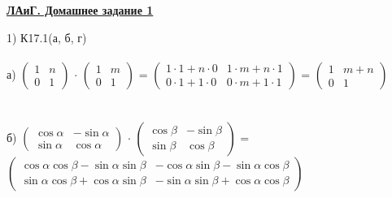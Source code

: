 \documentclass[12pt, a4paper]{article}
\newcommand{\B}[1]{\textbf{#1}}
\begin{document}
	\begin{center}
		\B{\underline{ЛАиГ. Домашнее задание 1}}
	\end{center}
	1) К17.1(а, б, г) \\
	\\
	а) 
	\begin{math}
		\left (
		\begin{array}{rr}
			1 & n\\
			0 & 1
		\end{array}
		\right )
	\end{math}
	$\cdot$ 
	\begin{math}
		\left (
		\begin{array}{rr}
			1 & m\\
			0 & 1
		\end{array}
		\right )
	\end{math}
	=
	\begin{math}
		\left (
		\begin{array}{rr}
			1 \cdot 1 + n \cdot 0 & 1 \cdot m + n \cdot 1\\
			0 \cdot 1 + 1 \cdot 0 & 0 \cdot m + 1 \cdot 1
		\end{array}
		\right )
	\end{math}
	=
	\begin{math}
		\left (
		\begin{array}{rr}
			1& m + n\\
			0 & 1
		\end{array}
		\right )
	\end{math}
	\\
	\\
	\\
	б)
	\begin{math}
		\left (
		\begin{array}{rr}
			\cos\alpha & -\sin\alpha\\
			\sin\alpha & \cos\alpha
		\end{array}
		\right )
	\end{math}
	$\cdot$
	\begin{math}
		\left (
		\begin{array}{rr}
			\cos\beta& -\sin\beta\\
			\sin\beta & \cos\beta
		\end{array}
		\right )
	\end{math}
	= 
	\begin{math}
		\left (
		\begin{array}{rr}
			\cos\alpha\cos\beta - \sin\alpha\sin\beta& -\cos\alpha\sin\beta - \sin\alpha\cos\beta\\
			\sin\alpha\cos\beta + \cos\alpha\sin\beta & -\sin\alpha\sin\beta + \cos\alpha\cos\beta
		\end{array}
		\right )
	\end{math}
\end{document}
